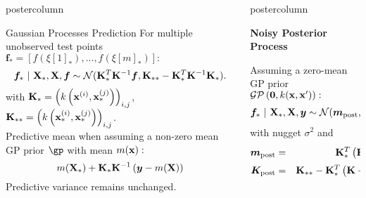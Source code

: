 \documentclass{beamer}
\newlength{\columnheight} %
\begin{document}
\begin{frame}[fragile]{}
\begin{columns}
\begin{column}{.31\textwidth}
\begin{beamercolorbox}[center]{postercolumn}
\begin{minipage}{.98\textwidth}
{\begin{myblock}{Gaussian Processes Prediction}
								For multiple unobserved test points
								$
								\bm{f}_* = \left[f\left(\xi[1]_*\right), ..., f\left(\xi[m]_*\right)\right]:
								$
								\begin{eqnarray*}
									\bm{f}_* ~|~ \Xmat_*, \Xmat, \bm{f} \sim \mathcal{N}(\Kmat_{*}^{T}\Kmat^{-1}\bm{f}, \Kmat_{**} - \Kmat_*^T \Kmat ^{-1}\Kmat_*).
								\end{eqnarray*} 
								with $\Kmat_* = \left(k\left(\xi, \xv_*^{(j)}\right)\right)_{i,j}$, $\Kmat_{**} = \left(k\left(\xi[i]_*, \xi[j]_*\right)\right)_{i,j}$.\\
								
								Predictive mean when assuming a non-zero mean GP prior $\gp$ with mean $m(\xv):$ 
								$$
								m(\Xmat_*) + \Kmat_*\Kmat^{-1}\left(\bm{y} - m(\Xmat)\right)
								$$
								Predictive variance remains unchanged. \\
								
							\end{myblock}

}
\end{minipage}
\end{beamercolorbox}
\end{column}


\begin{column}{.31\textwidth}
\begin{beamercolorbox}[center]{postercolumn}
\begin{minipage}{.98\textwidth}
\parbox[t][\columnheight]{\textwidth}{

 \begin{myblock}{}
\begin{codebox}
								\textbf{Noisy Posterior Process}
                \end{codebox}
								Assuming a zero-mean GP prior $\mathcal{GP}\left(\bm{0}, k(\xv, \xv^\prime)\right):$ 
								\begin{eqnarray*}
									\bm{f}_* ~|~ \Xmat_*, \Xmat, \bm{y} \sim \mathcal{N}(\bm{m}_{\text{post}}, \bm{K}_\text{post}).
								\end{eqnarray*}
								with nugget $\sigma^2 $ and
								\begin{eqnarray*}
									\bm{m}_{\text{post}} &=& \Kmat_{*}^{T} \left(\Kmat+ \sigma^2 \cdot \id\right)^{-1}\bm{y} \\
									\bm{K}_\text{post} &=& \Kmat_{**} - \Kmat_*^T \left(\Kmat  + \sigma^2 \cdot \id\right)^{-1}	\Kmat_*,	
								\end{eqnarray*} 
								

\end{myblock}}
\end{minipage}
\end{beamercolorbox}
\end{column}
\end{columns}
\end{frame}
\end{document}
